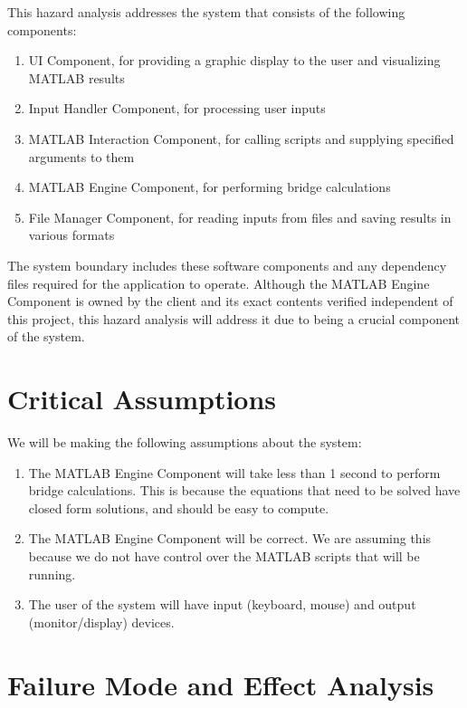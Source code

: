 \documentclass{article}
\begin{document}
This hazard analysis addresses the system that consists of the following components:

\begin{enumerate}
	\item UI Component, for providing a graphic display to the user and visualizing MATLAB results
	\item Input Handler Component, for processing user inputs
	\item MATLAB Interaction Component, for calling scripts and supplying specified arguments to them
	\item MATLAB Engine Component, for performing bridge calculations
	\item File Manager Component, for reading inputs from files and saving results in various formats
\end{enumerate}

The system boundary includes these software components and any dependency files required for the application to operate. Although the MATLAB Engine Component is owned by the client and its exact contents verified independent of this project, this hazard analysis will address it due to being a crucial component of the system.

\section{Critical Assumptions}

We will be making the following assumptions about the system:
\begin{enumerate}
    \item The MATLAB Engine Component will take less than 1 second to perform bridge calculations. 
    This is because the equations that need to be solved have closed form solutions, and should be easy
    to compute.
    \item The MATLAB Engine Component will be correct. We are assuming this because we do not have control
    over the MATLAB scripts that will be running.
    \item The user of the system will have input (keyboard, mouse) and output (monitor/display) devices.
\end{enumerate}

\section{Failure Mode and Effect Analysis}

\end{document}
